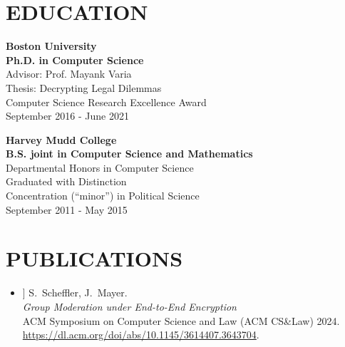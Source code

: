 \documentclass{res}
\begin{document}
\begin{resume}
    \vspace{0.1in}
\section{EDUCATION}  
\vspace{0.1in}

    \textbf{Boston University} \\
    \textbf{Ph.D. in Computer Science} \\
    Advisor: Prof. Mayank Varia \\
    Thesis: Decrypting Legal Dilemmas \\
    Computer Science Research Excellence Award \\
    September 2016 - June 2021

    \textbf{Harvey Mudd College} \\
    \textbf{B.S. joint in Computer Science and Mathematics}  \\
    Departmental Honors in Computer Science \\
    Graduated with Distinction \\
    Concentration (``minor'') in Political Science \\
    September 2011 - May 2015

\section{PUBLICATIONS}
\vspace{0.25in}

\newcommand{\eeegroup}{[1]\xspace}
\newcommand{\csamimprovements}{[2]\xspace}
\newcommand{\eeesok}{[3]\xspace}
\newcommand{\foregoneVerif}{[4]\xspace}
\newcommand{\copyrightMDL}{[5]\xspace}
\newcommand{\turboikos}{[6]\xspace}
\newcommand{\booligero}{[7]\xspace}
\newcommand{\foregoneconclusion}{[8]\xspace}
\newcommand{\privateTranslation}{[9]\xspace}
\newcommand{\AEC}{[10]\xspace}
\newcommand{\pullingblocksJIP}{[11]\xspace}
\newcommand{\devicefingerprinting}{[12]\xspace}
\newcommand{\pullingblocks}{[13]\xspace}
\newcommand{\fairsibility}{[14]\xspace}
\newcommand{\emailspam}{[15]\xspace}

\begin{itemize}
\item[\eeegroup] S.~Scheffler, J.~Mayer. \\
\emph{Group Moderation under End-to-End Encryption} \\
ACM Symposium on Computer Science and Law (ACM CS\&Law) 2024. \\
\url{https://dl.acm.org/doi/abs/10.1145/3614407.3643704}.


\end{itemize}
\end{resume}
\end{document}
